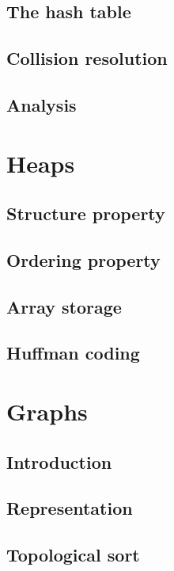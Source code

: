 \documentclass[11pt,twoside]{book}
\begin{document}
\section{The hash table}

\section{Collision resolution}

\section{Analysis}


\chapter{Heaps}

\section{Structure property}

\section{Ordering property}

\section{Array storage}

\section{Huffman coding}


\chapter{Graphs}

\section{Introduction}

\section{Representation}

\section{Topological sort}
\end{document}
